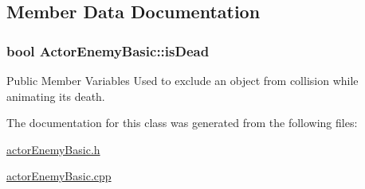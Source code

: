 \subsection{Member Data Documentation}
\subsubsection[{\texorpdfstring{is\+Dead}{isDead}}]{\setlength{\rightskip}{0pt plus 5cm}bool Actor\+Enemy\+Basic\+::is\+Dead}\hypertarget{class_actor_enemy_basic_ad3e644b5068939233cf710b9067868bc}{}\label{class_actor_enemy_basic_ad3e644b5068939233cf710b9067868bc}
Public Member Variables Used to exclude an object from collision while animating its death. 

The documentation for this class was generated from the following files\+:\begin{DoxyCompactItemize}
\item 
\hyperlink{actor_enemy_basic_8h}{actor\+Enemy\+Basic.\+h}\item 
\hyperlink{actor_enemy_basic_8cpp}{actor\+Enemy\+Basic.\+cpp}\end{DoxyCompactItemize}
